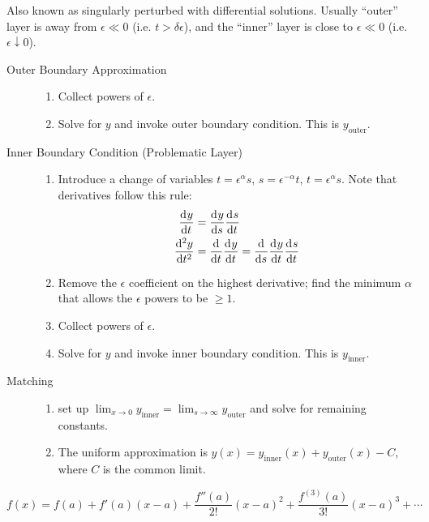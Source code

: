 \item[Boundary Layers] Also known as singularly perturbed with differential
  solutions. Usually ``outer'' layer is away from $\epsilon\ll0$ (i.e.
  $t>\delta\epsilon$), and the ``inner'' layer is close to $\epsilon\ll0$ (i.e.
  $\epsilon\downarrow0$).
  \begin{description}
  \item [Outer Boundary Approximation] \hfill
    \begin{enumerate}
    \item Collect powers of $\epsilon$.
    \item Solve for $y$ and invoke outer boundary condition. This is
      $y_{\text{outer}}$.
    \end{enumerate}
  \item[Inner Boundary Condition (Problematic Layer)] \hfill
    \begin{enumerate}
    \item Introduce a change of variables $t=\epsilon^{\alpha}s$,
      $s=\epsilon^{-\alpha}t$, $t=\epsilon^{\alpha}s$. Note that derivatives
      follow this rule:
      \begin{align*}
        \od{y}{t} &= \od{y}{s}\od{s}{t} \\
        \od[2]{y}{t} &= \od{}{t}\od{y}{t} = \od{}{s}\od{y}{t}\od{s}{t}
      \end{align*}
    \item Remove the $\epsilon$ coefficient on the highest derivative; find the
      minimum $\alpha$ that allows the $\epsilon$ powers to be $\ge1$.
    \item Collect powers of $\epsilon$.
    \item Solve for $y$ and invoke inner boundary condition. This is
      $y_{\text{inner}}$.
    \end{enumerate}
  \item[Matching] \hfill
    \begin{enumerate}
    \item set up
      $\lim_{x\rightarrow0}y_{\text{inner}}=\lim_{s\rightarrow\infty}y_{\text{outer}}$
      and solve for remaining constants.
    \item The uniform approximation is $y(x)=y_{\text{inner}}(x) +
      y_{\text{outer}}(x)-C$, where $C$ is the common limit.
    \end{enumerate}
  \end{description}

\item[Taylor Series]
  $$f(x)=f(a)+f'(a)(x-a)+\frac{f''(a)}{2!}{(x-a)}^2+\frac{f^{(3)}(a)}{3!}{(x-a)}^3+\cdots$$


